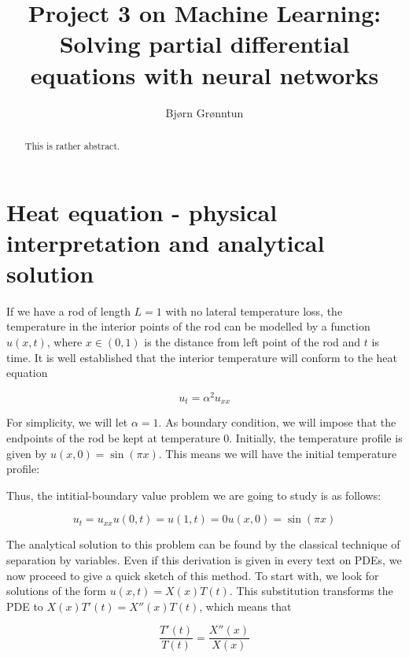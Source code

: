 \documentclass{article}
\title{Project 3 on Machine Learning: Solving partial differential equations with neural networks}
\author{Bj{\o}rn Gr{\o}nntun}
\begin{document}
\maketitle

\begin{abstract}
    This is rather abstract.
\end{abstract}

\section{Heat equation - physical interpretation and analytical solution}
If we have a rod of length $L=1$ with no lateral temperature loss, the temperature in the interior points of the rod can be modelled by a function $u(x, t)$, where $x\in (0, 1)$ is the distance from left point of the rod and $t$ is time. It is well established that the interior temperature will conform to the heat equation

\begin{equation}
    u_t = \alpha^2 u_{xx}
\end{equation}

For simplicity, we will let $\alpha=1$. As boundary condition, we will impose that the endpoints of the rod be kept at temperature 0. Initially, the temperature profile is given by $u(x, 0) = \sin(\pi x)$. This means we will have the initial temperature profile:

\begin{figure}

\end{figure}

Thus, the intitial-boundary value problem we are going to study is as follows:

\begin{equation}
    u_t = u_{xx}
    u(0, t) = u(1, t) = 0
    u(x, 0) = \sin(\pi x)
\end{equation}

The analytical solution to this problem can be found by the classical technique of separation by variables. Even if this derivation is given in every text on PDEs, we now proceed to give a quick sketch of this method. To start with, we look for solutions of the form $u(x, t) = X(x) T(t)$. This substitution transforms the PDE to $X(x) T'(t) = X''(x) T(t)$, which means that

\begin{equation}
    \frac{T'(t)}{T(t)} = \frac{X''(x)}{X(x)}
\end{equation}
\end{document}
